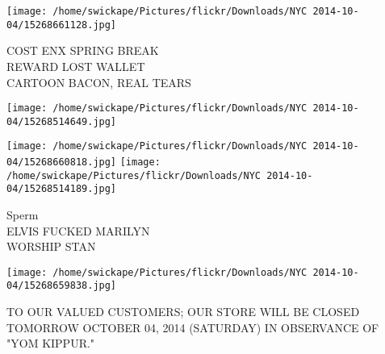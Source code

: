\documentclass[10pt,letterpaper]{article}
\begin{document}
\vspace{0.25in}
\texttt{[image: /home/swickape/Pictures/flickr/Downloads/NYC 2014-10-04/15268661128.jpg]}

COST ENX SPRING BREAK\\
REWARD LOST WALLET\\
CARTOON BACON, REAL TEARS\\
\pagebreak

\texttt{[image: /home/swickape/Pictures/flickr/Downloads/NYC 2014-10-04/15268514649.jpg]}

\vspace{0.25in}
\texttt{[image: /home/swickape/Pictures/flickr/Downloads/NYC 2014-10-04/15268660818.jpg]}
\texttt{[image: /home/swickape/Pictures/flickr/Downloads/NYC 2014-10-04/15268514189.jpg]}

Sperm\\
ELVIS FUCKED MARILYN\\
WORSHIP STAN\\
\pagebreak

\texttt{[image: /home/swickape/Pictures/flickr/Downloads/NYC 2014-10-04/15268659838.jpg]}

TO OUR VALUED CUSTOMERS; OUR STORE WILL BE CLOSED TOMORROW OCTOBER 04, 2014 (SATURDAY) IN OBSERVANCE OF "YOM KIPPUR."\\
\pagebreak
\end{document}

